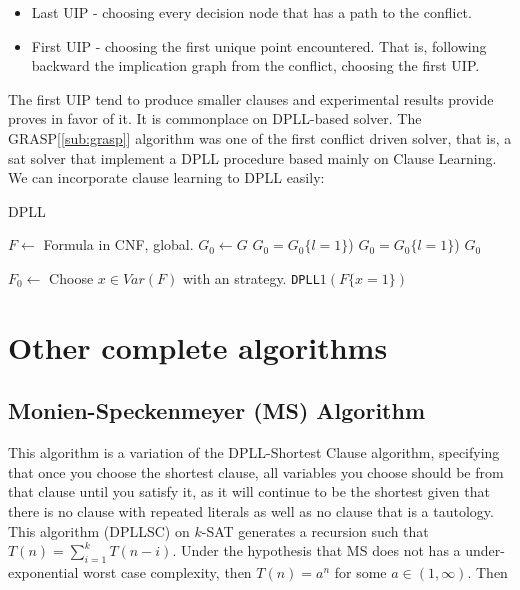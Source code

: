 \begin{itemize}
\item Last UIP - choosing every decision node that has a path to the conflict.
\item First UIP - choosing the first unique point encountered. That is, following backward the implication graph from the conflict, choosing the first UIP.
\end{itemize}


The first UIP tend to produce smaller clauses and experimental results \cite{tichy2006clause} \cite{zhang2001efficient} provide proves in favor of it. It is commonplace on DPLL-based solver. The GRASP[\ref{sub:grasp}] algorithm was one of the first conflict driven solver, that is, a sat solver that implement a DPLL procedure based mainly on Clause Learning. \\

We can incorporate clause learning to DPLL easily:
 \begin{algorithm}
  \caption{DPLL}\label{dpll}  \begin{algorithmic}[1]
   \State $F\gets $  Formula in CNF, global.
   \State $G_0 \gets G$
     $G_0 = G_0\{l=1\}$)
    \EndIf
     $G_0 = G_0\{l=1\}$)
    \EndIf
\EndWhile
\State \Return $G_0$
\EndProcedure
    
    
\State $F_0 \gets $
     \Return 
    \EndIf
     
    \EndIf
    \State
  \State
  \State Choose $x \in Var(F)$ with an strategy.
   
  \EndIf
  \State \Return \texttt{DPLL}$1(F\{x=1\})$
\end{algorithmic}
\end{algorithm}




\section{Other complete algorithms}

\subsection{Monien-Speckenmeyer (MS) Algorithm}
\label{alg:MS}
This algorithm is a variation of the DPLL-Shortest Clause algorithm, specifying that once you choose the shortest clause, all variables you choose should be from that clause until you satisfy it, as it will continue to be the shortest given that there is no clause with repeated literals as well as no clause that is a tautology. This algorithm (DPLLSC) on $k$-SAT generates a recursion such that $T(n) = \sum_{i=1}^kT(n-i)$. Under the hypothesis that MS does not has a under-exponential worst case complexity, then $T(n) = a^n$ for some $a \in (1,\infty)$.  Then

